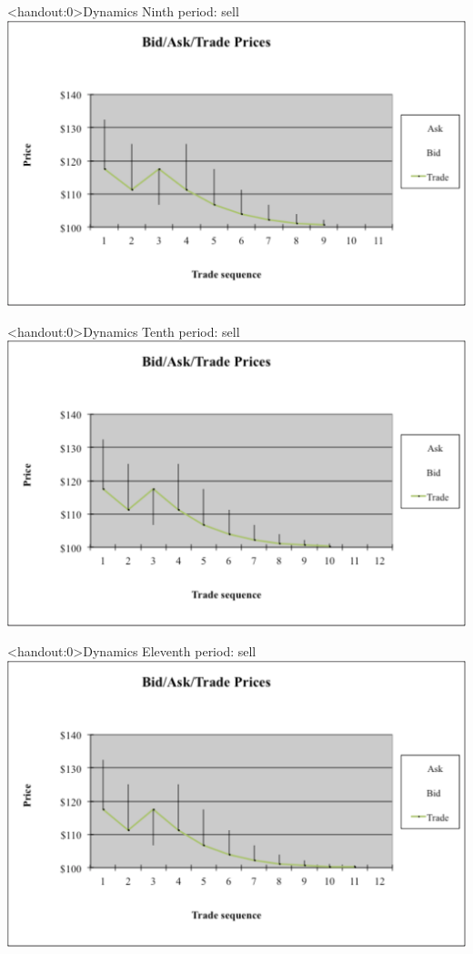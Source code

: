 \documentclass[english,10pt]{beamer}
\begin{document}
\begin{frame}<handout:0>{Dynamics}
	Ninth period: sell
	\center
	\includegraphics[width=0.9\linewidth]{pics/P9_Image.pdf}
\end{frame}


\begin{frame}<handout:0>{Dynamics}
	Tenth period: sell
	\center
	\includegraphics[width=0.9\linewidth]{pics/P10_Image.pdf}
\end{frame}


\begin{frame}<handout:0>{Dynamics}
	Eleventh period: sell
	\center
	\includegraphics[width=0.9\linewidth]{pics/P11_Image.pdf}
\end{frame}
\end{document}
